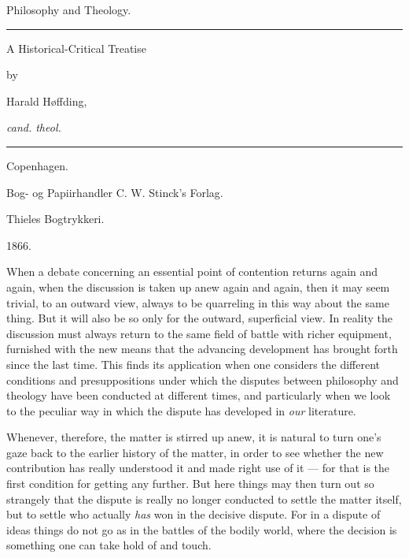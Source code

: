 \documentclass[12pt,a4paper]{book}
\newcommand{\opage}[1]{\marginnote{\footnotesize\textit{[#1]}}}
\begin{document}
\thispagestyle{empty}

\begin{center}
{\Huge Philosophy and Theology.}\par
\rule{4em}{0.4pt}\par\bigskip
{\large A Historical-Critical Treatise}\par\medskip
by\par\medskip
{\large Harald Høffding,}\par
\textit{cand. theol.}\par\bigskip
\rule{6em}{0.8pt}\par\bigskip
Copenhagen.\par
Bog- og Papiirhandler C. W. Stinck's Forlag.\par
{\small Thieles Bogtrykkeri.}\par
1866.
\end{center}
\clearpage

\opage{3}\setcounter{footnote}{0}%
When a debate concerning an essential point of contention
returns again and again, when the discussion is taken up
anew again and again, then it may seem trivial, to an outward
view, always to be quarreling in this way about the same thing. But
it will also be so only for the outward, superficial view.
In reality the discussion must always return to the same
field of battle with richer equipment, furnished with the new
means that the advancing development has brought forth since
the last time. This finds its application when one considers
the different conditions and presuppositions under which the
disputes between philosophy and theology have been
conducted at different times, and particularly when we look to
the peculiar way in which the dispute has developed
in \emph{our} literature.

Whenever, therefore, the matter is stirred up anew, it is
natural to turn one's gaze back to the earlier history of the
matter, in order to see whether the new contribution has really
understood it and made right use of it --- for that is the first
condition for getting any further. But here things may then turn out
so strangely that the dispute is really no longer conducted to settle
the matter itself, but to settle who actually \emph{has}
won in the decisive dispute. For in a dispute of ideas things
do not go as in the battles of the bodily world, where the
decision is something one can take hold of and touch.
\end{document}
